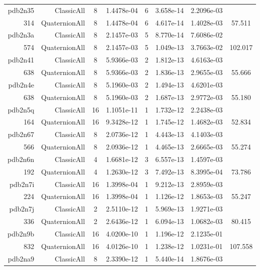\begin{xltabular}{\textwidth}{r|rcS[table-format=1.4e+2]cS[table-format=1.3e+2]S[table-format=1.4e+2]S[table-format=-1.3]}
pdb2n35 & ClassicAll & 8 & 1.4478e-04 & 6 & 3.658e-14 & 2.2096e-03 & \\
314 & QuaternionAll & 8 & 1.4478e-04 & 6 & 4.617e-14 & 1.4028e-03 & 57.511\\  \addlinespace
pdb2n3a & ClassicAll & 8 & 2.1457e-03 & 5 & 8.770e-14 & 7.6086e-02 & \\
574 & QuaternionAll & 8 & 2.1457e-03 & 5 & 1.049e-13 & 3.7663e-02 & 102.017\\  \addlinespace
pdb2n41 & ClassicAll & 8 & 5.9366e-03 & 2 & 1.812e-13 & 4.6163e-03 & \\
638 & QuaternionAll & 8 & 5.9366e-03 & 2 & 1.836e-13 & 2.9655e-03 & 55.666\\  \addlinespace
pdb2n4e & ClassicAll & 8 & 5.1960e-03 & 2 & 1.494e-13 & 4.6201e-03 & \\
638 & QuaternionAll & 8 & 5.1960e-03 & 2 & 1.687e-13 & 2.9772e-03 & 55.180\\  \addlinespace
pdb2n5q & ClassicAll & 16 & 1.1051e-11 & 1 & 1.732e-12 & 2.2438e-03 & \\
164 & QuaternionAll & 16 & 9.3428e-12 & 1 & 1.745e-12 & 1.4682e-03 & 52.834\\  \addlinespace
pdb2n67 & ClassicAll & 8 & 2.0736e-12 & 1 & 4.443e-13 & 4.1403e-03 & \\
566 & QuaternionAll & 8 & 2.0936e-12 & 1 & 4.465e-13 & 2.6665e-03 & 55.274\\  \addlinespace
pdb2n6n & ClassicAll & 4 & 1.6681e-12 & 3 & 6.557e-13 & 1.4597e-03 & \\
192 & QuaternionAll & 4 & 1.2630e-12 & 3 & 7.492e-13 & 8.3995e-04 & 73.786\\  \addlinespace
pdb2n7i & ClassicAll & 16 & 1.3998e-04 & 1 & 9.212e-13 & 2.8959e-03 & \\
224 & QuaternionAll & 16 & 1.3998e-04 & 1 & 1.126e-12 & 1.8653e-03 & 55.247\\  \addlinespace
pdb2n7j & ClassicAll & 2 & 2.5110e-12 & 1 & 5.969e-13 & 1.9271e-03 & \\
336 & QuaternionAll & 2 & 2.6436e-12 & 1 & 6.094e-13 & 1.0682e-03 & 80.415\\  \addlinespace
pdb2n9b & ClassicAll & 16 & 4.0200e-10 & 1 & 1.196e-12 & 2.1235e-01 & \\
832 & QuaternionAll & 16 & 4.0126e-10 & 1 & 1.238e-12 & 1.0231e-01 & 107.558\\  \addlinespace
pdb2na9 & ClassicAll & 8 & 2.3390e-12 & 1 & 5.440e-14 & 1.8676e-03 & \\

\end{xltabular}
